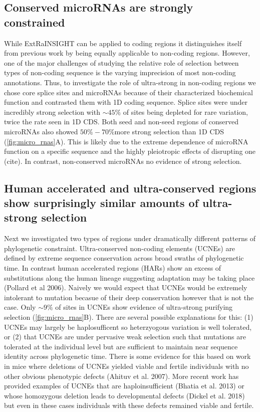 \documentclass[11pt]{article}
\begin{document}
\subsection*{Conserved microRNAs are strongly constrained}
While ExtRaINSIGHT can be applied to coding regions it distinguishes itself from previous work by being equally applicable to non-coding regions. However, one of the major challenges of studying the relative role of selection between types of non-coding sequence is the varying imprecision of most non-coding annotations. Thus, to investigate the role of ultra-strong in non-coding regions we chose core splice sites and microRNAs because of their characterized biochemical function and contrasted them with 1D coding sequence. Splice sites were under incredibly strong selection with $\sim45\%$ of sites being depleted for rare variation, twice the rate seen in 1D CDS. Both seed and non-seed regions of conserved microRNAs also showed $50\%-70\%$more strong selection than 1D CDS (\ref{fig:micro_rnas}A). This is likely due to the extreme dependence of microRNA function on a specific sequence and the highly pleiotropic effects of disrupting one (cite). In contrast, non-conserved microRNAs no evidence of strong selection.

\subsection*{Human accelerated and ultra-conserved regions show surprisingly similar amounts of ultra-strong selection}

Next we investigated two types of regions under dramatically different patterns of phylogenetic constraint. Ultra-conserved non-coding elements (UCNEs) are defined by extreme sequence conservation across broad swaths of phylogenetic time. In contrast human accelerated regions (HARs) show an excess of substitutions along the human lineage suggesting adaptation may be taking place (Pollard et al 2006). Naively we would expect that UCNEs would be extremely intolerant to mutation becasue of their deep conservation however that is not the case. Only $\sim 9\%$ of sites in UCNEs show evidence of ultra-strong purifying selection (\ref{fig:micro_rnas}B). There are several possible explanations for this: (1) UCNEs may largely be haplosufficent so heterzyogous variation is well tolerated, or (2) that UCNEs are under pervasive weak selection such that mutations are tolerated at the individual level but are sufficient to maintain near sequence identity across phylogenetic time. There is some evidence for this based on work in mice where deletions of UCNEs yielded viable and fertile individuals with no other obvious phenotypic defects (Ahituv et al. 2007). More recent work has provided examples of UCNEs that are haploinsufficient (Bhatia et al. 2013) or whose homozygous deletion leads to developmental defects (Dickel et al. 2018) but even in these cases individuals with these defects remained viable and fertile.
\end{document}
